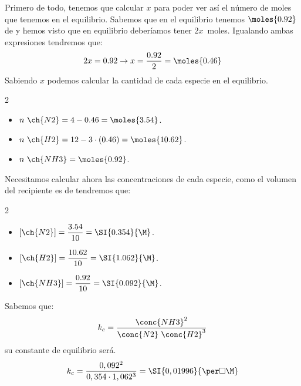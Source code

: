 \begin{example}
\begin{enumerate}[label=\letraminuscula]
            Primero de todo, tenemos que calcular $x$ para poder ver así el número de moles que tenemos en el equilibrio.
            Sabemos que en el equilibrio tenemos $\moles{0.92}$ de  y hemos visto que en equilibrio deberíamos tener $2x$\ moles.
            Igualando ambas expresiones tendremos que:
            \begin{gather*}
                2x = 0.92 \rightarrow x = \dfrac{0.92}{2} = \moles{0.46}
            \end{gather*}
            Sabiendo \(x\) podemos calcular la cantidad de cada especie en el equilibrio.
            \begin{multicols}{2}
                \begin{itemize}
                    \item $n\ \ch{N2} = 4 - 0.46  =  \moles{3.54}$.
                    \item  $n\ \ch{H2} = 12 - 3\cdot (0.46)  =  \moles{10.62}$.
                    \item $n\ \ch{NH3} =  \moles{0.92}$.
                \end{itemize}
            \end{multicols}
            Necesitamos calcular ahora las concentraciones de cada especie, como el volumen del recipiente es de  tendremos que:

            \begin{multicols}{2}
                \begin{itemize}
                    \item $[\ch{N2}] = \dfrac{3.54}{10} = \SI{0.354}{\M}$.
                    \item $[\ch{H2}] = \dfrac{10.62}{10} = \SI{1.062}{\M}$.
                    \item $[\ch{NH3}] = \dfrac{0.92}{10} = \SI{0.092}{\M}$.
                \end{itemize}
            \end{multicols}

            Sabemos que:
            \begin{equation*}
                k_c = \dfrac{\conc{NH3}^2}{\conc{N2}\ \conc{H2}^3}
            \end{equation*}
            su constante de equilibrio será.
            \begin{equation*}
                k_c = \dfrac{0,092^2}{0,354\cdot 1,062^3} = \SI{0,01996}{\per\square\M}
            \end{equation*}
        \end{enumerate}
    \end{example}

